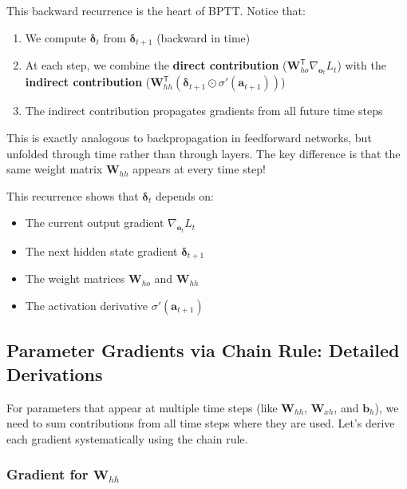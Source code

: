 \begin{notechapter}
\begin{keyinsight}[title=The Recursive Structure of BPTT]
This backward recurrence is the heart of BPTT. Notice that:
\begin{enumerate}[itemsep=0pt]
    \item We compute $\bm{\delta}_t$ from $\bm{\delta}_{t+1}$ (backward in time)
    \item At each step, we combine the \textbf{direct contribution} ($\mathbf{W}_{ho}^\mathsf{T} \nabla_{\mathbf{o}_t} L_t$) with the \textbf{indirect contribution} ($\mathbf{W}_{hh}^\mathsf{T} (\bm{\delta}_{t+1} \odot \sigma'(\mathbf{a}_{t+1}))$)
    \item The indirect contribution propagates gradients from all future time steps
\end{enumerate}
This is exactly analogous to backpropagation in feedforward networks, but
unfolded through time rather than through layers. The key difference is that the
same weight matrix $\mathbf{W}_{hh}$ appears at every time step!
\end{keyinsight}

This recurrence shows that $\bm{\delta}_t$ depends on:
\begin{itemize}
    \item The current output gradient $\nabla_{\mathbf{o}_t} L_t$
    \item The next hidden state gradient $\bm{\delta}_{t+1}$
    \item The weight matrices $\mathbf{W}_{ho}$ and $\mathbf{W}_{hh}$
    \item The activation derivative $\sigma'(\mathbf{a}_{t+1})$
\end{itemize}

\subsection{Parameter Gradients via Chain Rule: Detailed Derivations}

For parameters that appear at multiple time steps (like $\mathbf{W}_{hh}$,
$\mathbf{W}_{xh}$, and $\mathbf{b}_h$), we need to sum contributions from
all time steps where they are used.
Let's derive each gradient systematically using the chain rule.
\subsubsection{Gradient for $\mathbf{W}_{hh}$}


\end{notechapter}
